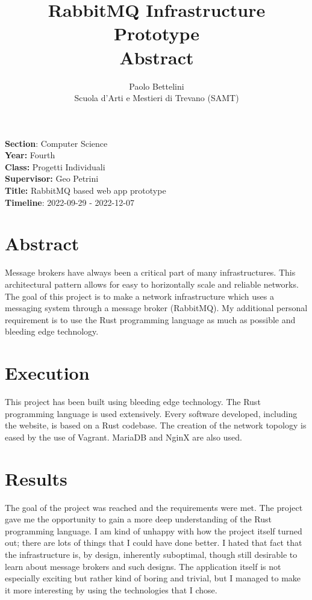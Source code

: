 \documentclass{article}
\title{%
    RabbitMQ Infrastructure Prototype \\
    \large Abstract
}
\author{%
    Paolo Bettelini \\
    \large Scuola d'Arti e Mestieri di Trevano (SAMT)}
\date{}
\begin{document}
\maketitle

\vspace{2cm}

\textbf{Section}: Computer Science \\
\textbf{Year:} Fourth \\
\textbf{Class:} Progetti Individuali \\
\textbf{Supervisor:} Geo Petrini \\
\textbf{Title:} RabbitMQ based web app prototype \\
\textbf{Timeline}: 2022-09-29 - 2022-12-07

\vspace{2cm}

\thispagestyle{empty} %

\section*{Abstract}

Message brokers have always been a critical part of many infrastructures.
This architectural pattern allows for easy to horizontally scale and reliable networks.
The goal of this project is to make a network infrastructure
which uses a messaging system through a message broker (RabbitMQ).
My additional personal requirement is to use the Rust programming language
as much as possible and bleeding edge technology.

\section*{Execution}

This project has been built using bleeding edge technology.
The Rust programming language is used extensively. Every software
developed, including the website, is based on a Rust codebase.
The creation of the network topology is eased by the use of Vagrant.
MariaDB and NginX are also used.

\section*{Results}

The goal of the project was reached and the requirements were met.
The project gave me the opportunity to gain a more deep
understanding of the Rust programming language. I am kind of unhappy
with how the project itself turned out; there are lots of things
that I could have done better. I hated that fact that
the infrastructure is, by design, inherently suboptimal,
though still desirable to learn about message brokers and such designs.
The application itself is not especially exciting
but rather kind of boring and trivial, but I managed
to make it more interesting by using the technologies that I chose.
\end{document}
